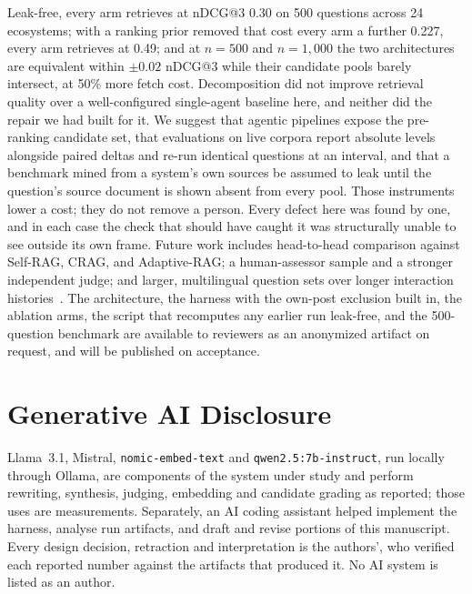 \documentclass[10pt,conference]{IEEEtran}
\begin{document}
Leak-free, every arm retrieves at nDCG@3 0.30 on 500 questions across 24
ecosystems; with a ranking prior removed that cost every arm a further 0.227, every
arm retrieves at 0.49; and at $n=500$ and $n=1{,}000$ the two architectures are
equivalent within $\pm0.02$ nDCG@3 while their candidate pools barely intersect, at
50\% more fetch cost. Decomposition did not improve retrieval quality over a
well-configured single-agent baseline here, and neither did the repair we had built
for it. We suggest that agentic pipelines expose the pre-ranking candidate set,
that evaluations on live corpora report absolute levels alongside paired deltas and
re-run identical questions at an interval, and that a benchmark mined from a
system's own sources be assumed to leak until the question's source document is
shown absent from every pool. Those instruments lower a cost; they do not remove a
person. Every defect here was found by one, and in each case the check that should
have caught it was structurally unable to see outside its own frame. Future work
includes head-to-head comparison against Self-RAG, CRAG, and Adaptive-RAG; a
human-assessor sample and a stronger independent judge; and larger, multilingual
question sets over longer interaction
histories~\cite{yang2024,ranaldi2025,reuter2025}. The architecture, the harness
with the own-post exclusion built in, the ablation arms, the script that recomputes
any earlier run leak-free, and the 500-question benchmark are available to
reviewers as an anonymized artifact on request, and will be published on
acceptance.

\section*{Generative AI Disclosure}

Llama~3.1, Mistral, \texttt{nomic-embed-text} and \texttt{qwen2.5:7b-instruct},
run locally through Ollama, are components of the system under study and perform
rewriting, synthesis, judging, embedding and candidate grading as reported; those
uses are measurements. Separately, an AI coding assistant helped implement the
harness, analyse run artifacts, and draft and revise portions of this manuscript.
Every design decision, retraction and interpretation is the authors', who verified
each reported number against the artifacts that produced it. No AI system is listed
as an author.



\end{document}
